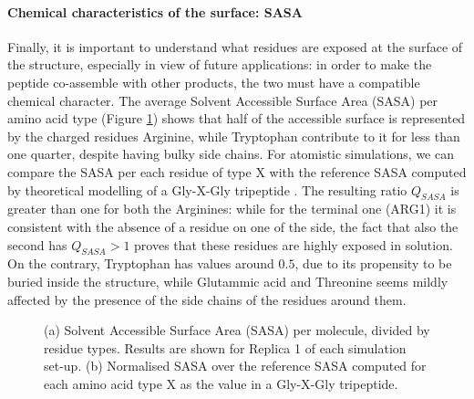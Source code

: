 \paragraph{Chemical characteristics of the surface: SASA} Finally, it is important to understand what residues are exposed at the surface of the structure, especially in view of future applications: in order to make the peptide co-assemble with other products, the two must have a compatible chemical character. The average Solvent Accessible Surface Area (SASA) per amino acid type (Figure \ref{fig:BTI_sasa_exposed}) shows that half of the accessible surface is represented by the charged residues Arginine, while Tryptophan contribute to it for less than one quarter, despite having bulky side chains.
%
For atomistic simulations, we can compare the SASA per each residue of type X with the reference SASA computed by theoretical modelling of a Gly-X-Gly tripeptide \citep{Tien2013}. The resulting ratio $Q_{SASA}$ is greater than one for both the Arginines: while for the terminal one (ARG1) it is consistent with the absence of a residue on one of the side, the fact that also the second has $Q_{SASA}>1$ proves that these residues are highly exposed in solution. On the contrary, Tryptophan has values around $0.5$, due to its propensity to be buried inside the structure, while Glutammic acid and Threonine seems mildly affected by the presence of the side chains of the residues around them.
\begin{figure}[t]
\centering
{} 
\caption[SASA per residue of a buckyball in solution]{(a) Solvent Accessible Surface Area (SASA) per molecule, divided by residue types. Results are shown for Replica 1 of each simulation set-up. (b) Normalised SASA over the reference SASA computed for each amino acid type X as the value in a Gly-X-Gly tripeptide.}
\label{fig:BTI_sasa_exposed}
\end{figure}

